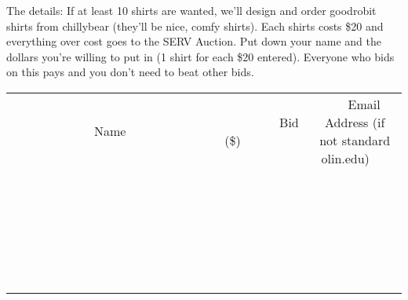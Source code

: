\documentclass[11pt]{article}
\begin{document}
The details: If at least 10 shirts are wanted, we'll design and order goodrobit shirts from chillybear (they'll be nice, comfy shirts). Each shirts costs \$20 and everything over cost goes to the SERV Auction.  Put down your name and the dollars you're willing to put in (1 shirt for each \$20 entered). Everyone who bids on this pays and you don't need to beat other bids.
\\[6ex]
\begin{tabular}{c c c}
~~~~~~~~~~~~~Name~~~~~~~~~~~~~ & ~~~~~~~~~Bid (\$)~~~~~~~~~  & ~~~Email Address (if not standard olin.edu)~~~\\
 & & \\
\hline
 & & \\
\hline
 & & \\
\hline
 & & \\
\hline
 & & \\
\hline
 & & \\
\hline
 & & \\
\hline
 & & \\
\hline
 & & \\
\hline
 & & \\
\hline
 & & \\
\hline
 & & \\
\hline
 & & \\
\hline
 & & \\
\hline
 & & \\
\hline
 & & \\
\hline
 & & \\
\hline
 & & \\
\hline
 & & \\
\hline
 & & \\
\hline
 & & \\
\hline
 & & \\
\hline
 & & \\
\hline
 & & \\
\hline
 & & \\
\hline
 & & \\
\hline
\end{tabular}
\newpage
\end{document}

